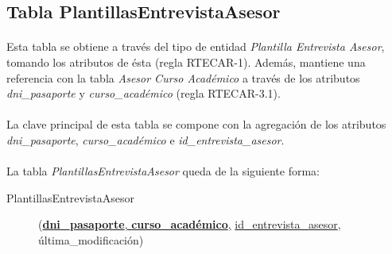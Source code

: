    \subsection{Tabla PlantillasEntrevistaAsesor}

      \paragraph{}Esta tabla se obtiene a través del tipo de entidad
      \textit{Plantilla Entrevista Asesor}, tomando los atributos de ésta
      (regla RTECAR-1). Además, mantiene una referencia con la tabla
      \textit{Asesor Curso Académico} a través de los atributos
      \textit{dni\_pasaporte} y \textit{curso\_académico} (regla RTECAR-3.1).

      \paragraph{}La clave principal de esta tabla se compone con la agregación
      de los atributos \textit{dni\_pasaporte}, \textit{curso\_académico} e
      \textit{id\_entrevista\_asesor}.

      \paragraph{}La tabla \textit{PlantillasEntrevistaAsesor} queda de la
      siguiente forma:

      \begin{description}
         \item[PlantillasEntrevistaAsesor] \begin{flushleft}(\underline{\textbf{dni\_pasaporte},
         \textbf{curso\_académico},} \underline{id\_entrevista\_asesor},
         última\_modificación)\end{flushleft}
      \end{description}

